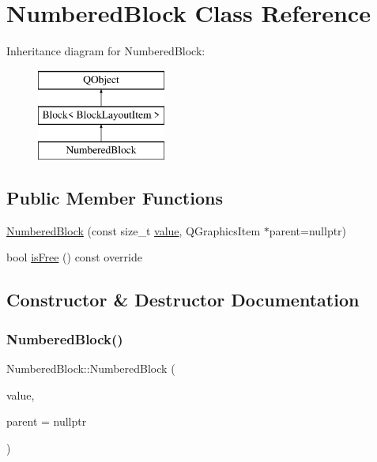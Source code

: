 \hypertarget{class_numbered_block}{}\section{Numbered\+Block Class Reference}
\label{class_numbered_block}
Inheritance diagram for Numbered\+Block\+:\begin{figure}[H]
\begin{center}
\leavevmode
\includegraphics[height=3.000000cm]{class_numbered_block}
\end{center}
\end{figure}
\subsection*{Public Member Functions}
\begin{DoxyCompactItemize}
\item 
\mbox{\hyperlink{class_numbered_block_a4ca70b5e1ada6cebea98b8ecff25dcc7}{Numbered\+Block}} (const size\+\_\+t \mbox{\hyperlink{class_block_ab0b547f273f8d5e4e783ccedaf13ef26}{value}}, Q\+Graphics\+Item $\ast$parent=nullptr)
\item 
bool \mbox{\hyperlink{class_numbered_block_a04899b0e9d90f4ce4faa8aae9e4140e9}{is\+Free}} () const override
\end{DoxyCompactItemize}


\subsection{Constructor \& Destructor Documentation}
\mbox{\label{class_numbered_block_a4ca70b5e1ada6cebea98b8ecff25dcc7}} 
\subsubsection{\texorpdfstring{NumberedBlock()}{NumberedBlock()}}
{\footnotesize\ttfamily Numbered\+Block\+::\+Numbered\+Block (\begin{DoxyParamCaption}\item[{const size\+\_\+t}]{value,  }\item[{Q\+Graphics\+Item $\ast$}]{parent = {\ttfamily nullptr} }\end{DoxyParamCaption})\hspace{0.3cm}{\ttfamily [inline]}}



